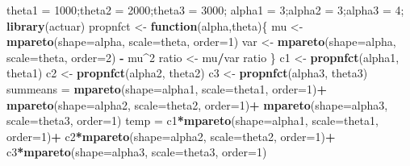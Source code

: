 \documentclass[]{book}
\newenvironment{Shaded}{\begin{snugshade}}{\end{snugshade}}
\newcommand{\KeywordTok}[1]{\textcolor[rgb]{0.13,0.29,0.53}{\textbf{#1}}}
\newcommand{\DataTypeTok}[1]{\textcolor[rgb]{0.13,0.29,0.53}{#1}}
\newcommand{\DecValTok}[1]{\textcolor[rgb]{0.00,0.00,0.81}{#1}}
\newcommand{\StringTok}[1]{\textcolor[rgb]{0.31,0.60,0.02}{#1}}
\newcommand{\ControlFlowTok}[1]{\textcolor[rgb]{0.13,0.29,0.53}{\textbf{#1}}}
\newcommand{\OperatorTok}[1]{\textcolor[rgb]{0.81,0.36,0.00}{\textbf{#1}}}
\newcommand{\NormalTok}[1]{#1}
\theoremstyle{definition}
\theoremstyle{definition}
\theoremstyle{definition}
\theoremstyle{remark}
\begin{document}
\hypertarget{toggleParetoRisksProp}{}
\begin{Shaded}
\begin{Highlighting}[]
\NormalTok{theta1 =}\StringTok{ }\DecValTok{1000}\NormalTok{;theta2 =}\StringTok{ }\DecValTok{2000}\NormalTok{;theta3 =}\StringTok{ }\DecValTok{3000}\NormalTok{;}
\NormalTok{alpha1 =}\StringTok{ }\DecValTok{3}\NormalTok{;alpha2 =}\StringTok{ }\DecValTok{3}\NormalTok{;alpha3 =}\StringTok{ }\DecValTok{4}\NormalTok{;}
\KeywordTok{library}\NormalTok{(actuar)}
\NormalTok{propnfct <-}\StringTok{ }\ControlFlowTok{function}\NormalTok{(alpha,theta)\{}
\NormalTok{  mu    <-}\StringTok{ }\KeywordTok{mpareto}\NormalTok{(}\DataTypeTok{shape=}\NormalTok{alpha, }\DataTypeTok{scale=}\NormalTok{theta, }\DataTypeTok{order=}\DecValTok{1}\NormalTok{)}
\NormalTok{  var   <-}\StringTok{ }\KeywordTok{mpareto}\NormalTok{(}\DataTypeTok{shape=}\NormalTok{alpha, }\DataTypeTok{scale=}\NormalTok{theta, }\DataTypeTok{order=}\DecValTok{2}\NormalTok{) }\OperatorTok{-}\StringTok{ }\NormalTok{mu}\OperatorTok{^}\DecValTok{2}
\NormalTok{  ratio <-}\StringTok{ }\NormalTok{mu}\OperatorTok{/}\NormalTok{var}
\NormalTok{  ratio}
\NormalTok{\}}
\NormalTok{c1 <-}\StringTok{ }\KeywordTok{propnfct}\NormalTok{(alpha1, theta1)}
\NormalTok{c2 <-}\StringTok{ }\KeywordTok{propnfct}\NormalTok{(alpha2, theta2)}
\NormalTok{c3 <-}\StringTok{ }\KeywordTok{propnfct}\NormalTok{(alpha3, theta3)}
\NormalTok{summeans =}\StringTok{ }\KeywordTok{mpareto}\NormalTok{(}\DataTypeTok{shape=}\NormalTok{alpha1, }\DataTypeTok{scale=}\NormalTok{theta1, }\DataTypeTok{order=}\DecValTok{1}\NormalTok{)}\OperatorTok{+}
\StringTok{           }\KeywordTok{mpareto}\NormalTok{(}\DataTypeTok{shape=}\NormalTok{alpha2, }\DataTypeTok{scale=}\NormalTok{theta2, }\DataTypeTok{order=}\DecValTok{1}\NormalTok{)}\OperatorTok{+}
\StringTok{           }\KeywordTok{mpareto}\NormalTok{(}\DataTypeTok{shape=}\NormalTok{alpha3, }\DataTypeTok{scale=}\NormalTok{theta3, }\DataTypeTok{order=}\DecValTok{1}\NormalTok{)  }
\NormalTok{temp =}\StringTok{ }\NormalTok{c1}\OperatorTok{*}\KeywordTok{mpareto}\NormalTok{(}\DataTypeTok{shape=}\NormalTok{alpha1, }\DataTypeTok{scale=}\NormalTok{theta1, }\DataTypeTok{order=}\DecValTok{1}\NormalTok{)}\OperatorTok{+}
\StringTok{       }\NormalTok{c2}\OperatorTok{*}\KeywordTok{mpareto}\NormalTok{(}\DataTypeTok{shape=}\NormalTok{alpha2, }\DataTypeTok{scale=}\NormalTok{theta2, }\DataTypeTok{order=}\DecValTok{1}\NormalTok{)}\OperatorTok{+}
\StringTok{       }\NormalTok{c3}\OperatorTok{*}\KeywordTok{mpareto}\NormalTok{(}\DataTypeTok{shape=}\NormalTok{alpha3, }\DataTypeTok{scale=}\NormalTok{theta3, }\DataTypeTok{order=}\DecValTok{1}\NormalTok{)  }

\end{Highlighting}
\end{Shaded}
\end{document}
